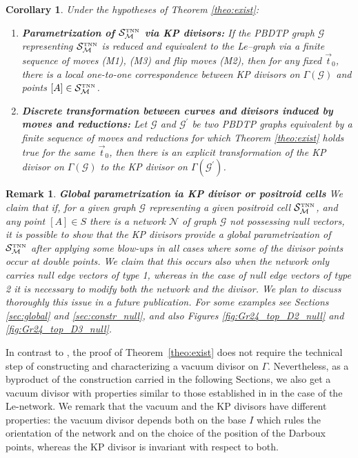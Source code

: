 \documentclass[11pt]{amsart}
\theoremstyle{plain}
\numberwithin{equation}{section}
\newtheorem{corollary}[theorem]{Corollary}
\newtheorem{remark}{Remark}[subsection]
\def \S {{\mathcal S}_{\mathcal M}^{\mbox{\tiny TNN}}}
\begin{document}
\begin{corollary}\label{cor:param}
Under the hypotheses of Theorem \ref{theo:exist}:
\begin{enumerate}
\item \textbf{Parametrization of $\S$ via KP divisors:}
If the PBDTP graph $\mathcal G$ representing $\S$ is reduced and equivalent to the Le--graph via a finite sequence of moves (M1), (M3) and flip moves (M2), then for any fixed
$\vec t_0$, there is a local one-to-one correspondence between KP divisors on $\Gamma (\mathcal G)$ and points $[A]\in \S$. 
\item \textbf{Discrete transformation between curves and divisors induced by moves and reductions:}
Let ${\mathcal G}$ and ${\mathcal G}^{\prime}$ be two PBDTP graphs equivalent by a finite sequence of moves and reductions for which Theorem \ref{theo:exist} holds true for the same $\vec t_0$, then there is an explicit transformation of the KP divisor on
$\Gamma(\mathcal G)$ to the KP divisor on $\Gamma({\mathcal G}^{\prime})$. 
\end{enumerate}
\end{corollary}

\begin{remark}\textbf{Global parametrization ia KP divisor or positroid cells} We claim that if, for a given graph $\mathcal G$ representing a given positroid cell $\S$, and any point $[A]\in S$ there is a network $\mathcal N$ of graph $\mathcal G$ not possessing null vectors, it is possible to show that the KP divisors provide a global parametrization of $\S$ after applying some blow-ups in all cases where some of the divisor points occur at double points. We claim that this occurs also when the network only carries null edge vectors of type 1, whereas in the case of null edge vectors of type 2 it is necessary to modify both the network and the divisor. We plan to discuss thoroughly this issue in a future publication. For some examples see Sections \ref{sec:global} and \ref{sec:constr_null}, and also Figures \ref{fig:Gr24_top_D2_null} and \ref{fig:Gr24_top_D3_null}.
\end{remark}

\smallskip

In contrast to \cite{AG1,AG3}, the proof of Theorem~\ref{theo:exist} does not require the technical step of constructing and characterizing a vacuum divisor on $\Gamma$. Nevertheless, as a byproduct of the construction carried in the following Sections, we also get a vacuum divisor with properties similar to those established in \cite{AG3} in the case of the Le-network. We remark that the vacuum and the KP divisors have different properties: the vacuum divisor depends both on the base $I$ which rules the orientation of the network and on the choice of the position of the Darboux points, whereas the KP divisor is invariant with respect to both.
\end{document}
